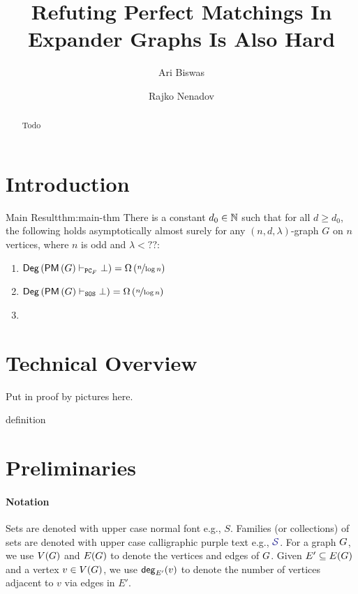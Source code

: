 \documentclass[11pt]{article}
\title{\textcolor{definitioncolor}{Refuting Perfect Matchings In Expander Graphs Is Also Hard}}
\author[1]{Ari Biswas}
\author[2]{Rajko Nenadov}
\affil[1]{\small University Of Warwick, United Kingdom}
\affil[2]{\small University Of Auckland, New Zealand}
\date{}
\newcommand{\Degree}[1]{\mathsf{Deg}\left(#1\right)}
\newcommand{\PerfectMatching}[1]{\mathsf{PM}\left(#1\right)}
\newcommand{\PC}{\vdash_{\texttt{PC}_F}}
\newcommand{\SOS}{\vdash_{\texttt{SOS}}}
\begin{document}
\maketitle
\begin{abstract}
Todo
\end{abstract}

\section{Introduction}


\begin{theorem}{Main Result}{thm:main-thm}
There is a constant $d_0 \in \mathbb{N}$ such that for all $d \geq d_0$, the following holds asymptotically almost surely for any $(n, d, \lambda)$-graph $G$ on $n$ vertices, where $n$ is odd and $\lambda < ??$:
\begin{enumerate}
    \item{ $\Degree{\PerfectMatching{G} \PC \bot} = \BigOmega{\nicefrac{n}{\log n}}$} 
    \item{$\Degree{\PerfectMatching{G} \SOS \bot} = \BigOmega{\nicefrac{n}{\log n}}$}
    \item {}
\end{enumerate}


\end{theorem}


\section{Technical Overview}

Put in proof by pictures here.

\begin{definition}
definition
\end{definition}

\section{Preliminaries}

\paragraph{Notation} Sets are denoted with upper case normal font e.g., $S$. Families (or collections) of sets are denoted with upper case calligraphic purple text e.g., $\Family{S}$. For a graph $G$, we use $V(G)$ and $E(G)$ to denote the vertices and edges of $G$. 
Given $E' \subseteq E(G)$ and a vertex $v \in V(G)$, we use $\mathsf{deg}_{E'}(v)$ to denote the number of vertices adjacent to $v$ via edges in $E'$.
\end{document}
